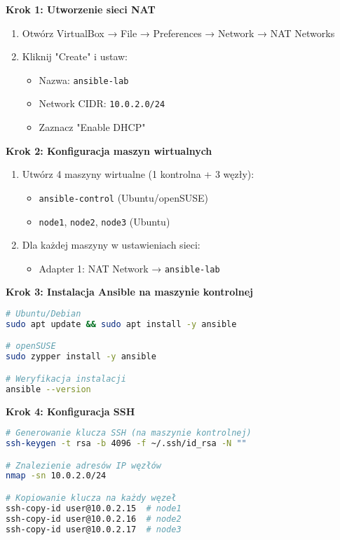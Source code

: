 \documentclass{article}
\begin{document}
\textbf{Krok 1: Utworzenie sieci NAT}
\begin{enumerate}
    \item Otwórz VirtualBox → File → Preferences → Network → NAT Networks
    \item Kliknij "Create" i ustaw:
    \begin{itemize}
        \item Nazwa: \texttt{ansible-lab}
        \item Network CIDR: \texttt{10.0.2.0/24}
        \item Zaznacz "Enable DHCP"
    \end{itemize}
\end{enumerate}

\textbf{Krok 2: Konfiguracja maszyn wirtualnych}
\begin{enumerate}
    \item Utwórz 4 maszyny wirtualne (1 kontrolna + 3 węzły):
    \begin{itemize}
        \item \texttt{ansible-control} (Ubuntu/openSUSE)
        \item \texttt{node1}, \texttt{node2}, \texttt{node3} (Ubuntu)
    \end{itemize}
    \item Dla każdej maszyny w ustawieniach sieci:
    \begin{itemize}
        \item Adapter 1: NAT Network → \texttt{ansible-lab}
    \end{itemize}
\end{enumerate}

\textbf{Krok 3: Instalacja Ansible na maszynie kontrolnej}
\begin{lstlisting}[language=bash]
# Ubuntu/Debian
sudo apt update && sudo apt install -y ansible

# openSUSE
sudo zypper install -y ansible

# Weryfikacja instalacji
ansible --version
\end{lstlisting}

\textbf{Krok 4: Konfiguracja SSH}
\begin{lstlisting}[language=bash]
# Generowanie klucza SSH (na maszynie kontrolnej)
ssh-keygen -t rsa -b 4096 -f ~/.ssh/id_rsa -N ""

# Znalezienie adresów IP węzłów
nmap -sn 10.0.2.0/24

# Kopiowanie klucza na każdy węzeł
ssh-copy-id user@10.0.2.15  # node1
ssh-copy-id user@10.0.2.16  # node2  
ssh-copy-id user@10.0.2.17  # node3
\end{lstlisting}
\end{document}
